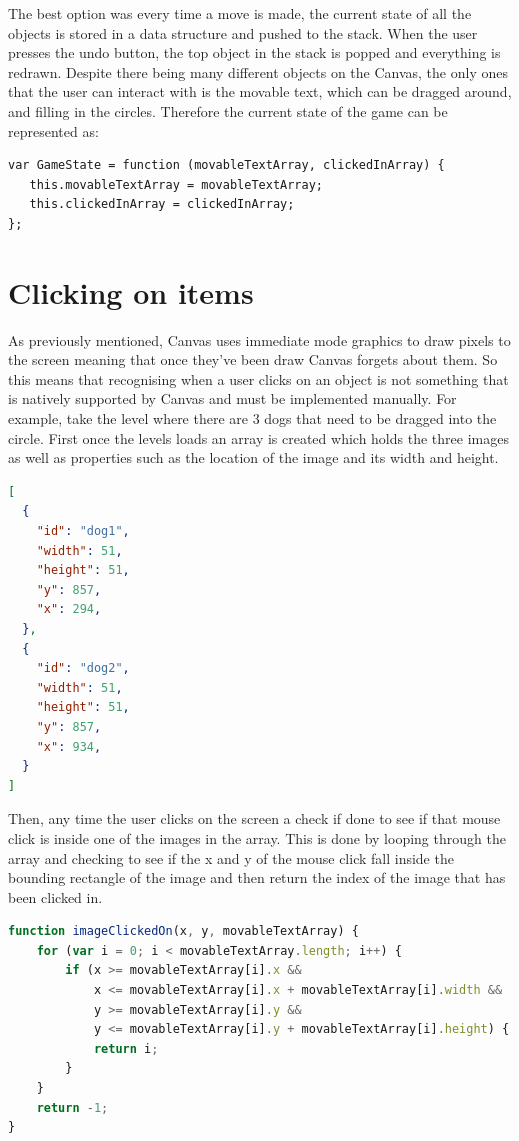 \documentclass[12pt,a4paper]{report}
\begin{document}
The best option was every time a move is made, the current state of all the objects is stored in a data structure and pushed to the stack. When the user presses the undo button, the top object in the stack is popped and everything is redrawn. Despite there being many different objects on the Canvas, the only ones that the user can interact with is the movable text, which can be dragged around, and filling in the circles. Therefore the current state of the game can be represented as:

\begin{lstlisting}
var GameState = function (movableTextArray, clickedInArray) {
   this.movableTextArray = movableTextArray;
   this.clickedInArray = clickedInArray;
};
\end{lstlisting}

\section{Clicking on items}
As previously mentioned, Canvas uses immediate mode graphics to draw pixels to the screen meaning that once they’ve been draw Canvas forgets about them. So this means that recognising when a user clicks on an object is not something that is natively supported by Canvas and must be implemented manually. 
For example, take the level where there are 3 dogs that need to be dragged into the circle. First once the levels loads an array is created which holds the three images as well as properties such as the location of the image and its width and height.
\begin{lstlisting}[language=json]
[
  {
    "id": "dog1",
    "width": 51,
    "height": 51,
    "y": 857,
    "x": 294,
  },
  {
    "id": "dog2",
    "width": 51,
    "height": 51,
    "y": 857,
    "x": 934,
  }
]
\end{lstlisting}

Then, any time the user clicks on the screen a check if done to see if that mouse click is inside one of the images in the array.
This is done by looping through the array and checking to see if the x and y of the mouse click fall inside the bounding rectangle of the image and then return the index of the image that has been clicked in.

\begin{lstlisting}[language=JavaScript]
function imageClickedOn(x, y, movableTextArray) {
    for (var i = 0; i < movableTextArray.length; i++) {
        if (x >= movableTextArray[i].x &&
            x <= movableTextArray[i].x + movableTextArray[i].width &&
            y >= movableTextArray[i].y &&
            y <= movableTextArray[i].y + movableTextArray[i].height) {
            return i;
        }
    }
    return -1;
}
\end{lstlisting}
\end{document}
